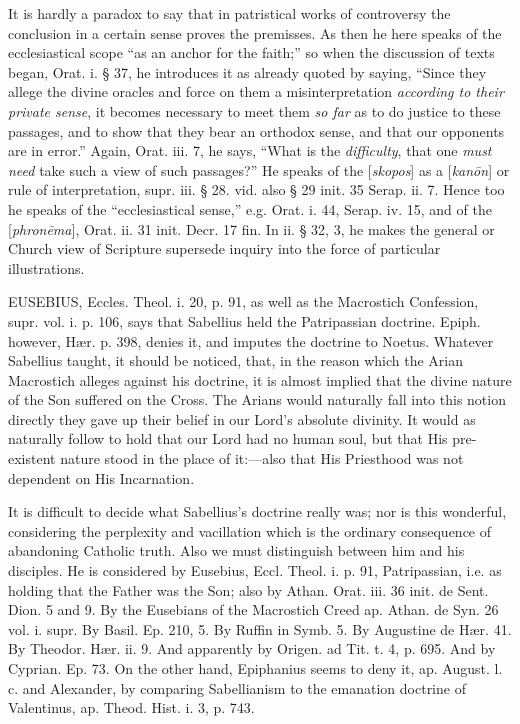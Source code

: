 It
is hardly a paradox to say that in patristical works of controversy
the conclusion in a certain sense proves the premisses. As then he
here speaks of the ecclesiastical scope ``as an anchor for the faith;''
so when the discussion of texts began, Orat. i. § 37, he introduces
it as already quoted by saying, ``Since they allege the divine oracles
and force on them a misinterpretation \emph{according to their private
sense}, it becomes necessary to meet them \emph{so far} as to do
justice to these passages, and to show that they bear an orthodox
sense, and that our opponents are in error.'' Again, Orat. iii. 7, he
says, ``What is the \emph{difficulty}, that one \emph{must need} take
such a view of such passages?'' He speaks of the [\emph{skopos}] as a [\emph{kan\={o}n}]
or rule of interpretation, supr. iii. § 28. vid. also § 29 init. 35
Serap. ii. 7. Hence too he speaks of the ``ecclesiastical sense,'' e.g.
Orat. i. 44, Serap. iv. 15, and of the [\emph{phron\={e}ma}], Orat.
ii. 31 init. Decr. 17 fin. In ii. § 32, 3, he makes the general or
Church view of Scripture supersede inquiry into the force of
particular illustrations.


EUSEBIUS,
Eccles. Theol. i. 20, p. 91, as well as the Macrostich Confession,
supr. vol. i. p. 106, says that Sabellius held the Patripassian
doctrine. Epiph. however, Hær. p. 398, denies it, and imputes the
doctrine to Noetus. Whatever Sabellius taught, it should be noticed,
that, in the reason which the Arian Macrostich alleges against his
doctrine, it is almost implied that the divine nature of the Son
suffered on the Cross. The Arians would naturally fall into this
notion directly they gave up their belief in our Lord's absolute
divinity. It would as naturally follow to hold that our Lord had no
human soul, but that His pre-existent nature stood in the place of
it:—also that His Priesthood was not dependent on His Incarnation.

It
is difficult to decide what Sabellius's doctrine really was; nor is
this wonderful, considering the perplexity and vacillation which is
the ordinary consequence of abandoning Catholic truth. Also we must
distinguish between him and his disciples. He is considered by
Eusebius, Eccl. Theol. i. p. 91, Patripassian, i.e. as holding that
the Father was the Son; also by Athan. Orat. iii. 36 init. de Sent.
Dion. 5 and 9. By the Eusebians of the Macrostich Creed ap. Athan. de
Syn. 26 vol. i. supr. By Basil. Ep. 210, 5. By Ruffin in Symb.
5. By Augustine de Hær. 41. By Theodor. Hær. ii. 9. And apparently
by Origen. ad Tit. t. 4, p. 695. And by Cyprian. Ep. 73. On the other
hand, Epiphanius seems to deny it, ap. August. l. c. and Alexander, by
comparing Sabellianism to the emanation doctrine of Valentinus, ap.
Theod. Hist. i. 3, p. 743.


